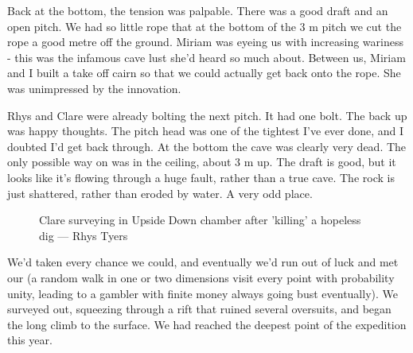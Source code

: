 Back at the bottom, the tension was palpable. There was a good draft and an open pitch. We had so little rope that at the bottom of the 3 m pitch we cut the rope a good metre off the ground. Miriam was eyeing us with increasing wariness - this was the infamous cave lust she’d heard so much about. Between us, Miriam and I built a take off cairn so that we could actually get back onto the rope. She was unimpressed by the innovation.
 
Rhys and Clare were already bolting the next pitch. It had one bolt. The back up was happy thoughts. The pitch head was one of the tightest I’ve ever done, and I doubted I’d get back through. At the bottom the cave was clearly very dead. The only possible way on was in the ceiling, about 3 m up. The draft is good, but it looks like it’s flowing through a huge fault, rather than a true cave. The rock is just shattered, rather than eroded by water. A very odd place.



\begin{figure}[h]
\checkoddpage \ifoddpage \forcerectofloat \else \forceversofloat \fi
\centering
{}
\caption{Clare surveying in Upside Down chamber after 'killing' a hopeless dig --- Rhys Tyers}
\label{Tight}
\end{figure}
 
We’d taken every chance we could, and eventually we’d run out of luck and met our  (a random walk in one or two dimensions visit every point with probability unity, leading to a gambler with finite money always going bust eventually). We surveyed out, squeezing through a rift that ruined several oversuits, and began the long climb to the surface. We had reached the deepest point of the expedition this year.
 
